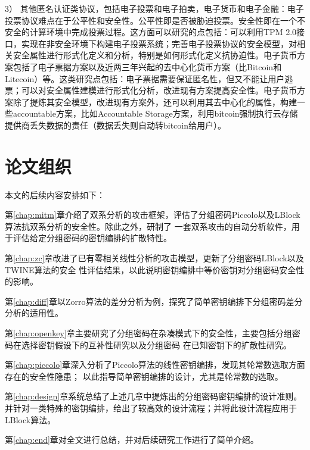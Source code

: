 3）	其他匿名认证类协议，包括电子投票和电子拍卖，电子货币和电子金融：电子投票协议难点在于公平性和安全性。公平性即是否被胁迫投票。安全性即在一个不安全的计算环境中完成投票过程。这方面可以研究的点包括：可以利用TPM 2.0接口，实现在非安全环境下构建电子投票系统；完善电子投票协议的安全模型，对相关安全属性进行形式化定义和分析，特别是如何形式化定义抗协迫性。电子货币方案包括了电子票据方案以及近两三年兴起的去中心化货币方案（比Bitcoin和Litecoin）等。这类研究点包括：电子票据需要保证匿名性，但又不能让用户逃票；可以对安全属性建模进行形式化分析，改进现有方案提高安全性。电子货币方案除了提炼其安全模型，改进现有方案外，还可以利用其去中心化的属性，构建一些accountable方案，比如Accountable Storage方案，利用bitcoin强制执行云存储提供商丢失数据的责任（数据丢失则自动转bitcoin给用户）。



\section{论文组织} \label{sec:structure}

本文的后续内容安排如下：

第\ref{chap:mitm}章介绍了双系分析的攻击框架，评估了分组密码Piccolo以及LBlock算法抗双系分析的安全性。除此之外，研制了
一套双系攻击的自动分析软件，用于评估给定分组密码的密钥编排的扩散特性。

第\ref{chap:zc}章改进了已有零相关线性分析的攻击模型，更新了分组密码LBlock以及TWINE算法的安全
性评估结果，以此说明密钥编排中等价密钥对分组密码安全性的影响。

第\ref{chap:diff}章以Zorro算法的差分分析为例，探究了简单密钥编排下分组密码差分分析的适用性。

第\ref{chap:openkey}章主要研究了分组密码在杂凑模式下的安全性，主要包括分组密码在选择密钥假设下的互补性研究以及分组密码
在已知密钥下的扩散性研究。

第\ref{chap:piccolo}章深入分析了Piccolo算法的线性密钥编排，发现其轮常数选取方面存在的安全性隐患；
以此指导简单密钥编排的设计，尤其是轮常数的选取。

第\ref{chap:design}章系统总结了上述几章中提炼出的分组密码密钥编排的设计准则。
并针对一类特殊的密钥编排，给出了较高效的设计流程；并将此设计流程应用于LBlock算法。

第\ref{chap:end}章对全文进行总结，并对后续研究工作进行了简单介绍。
